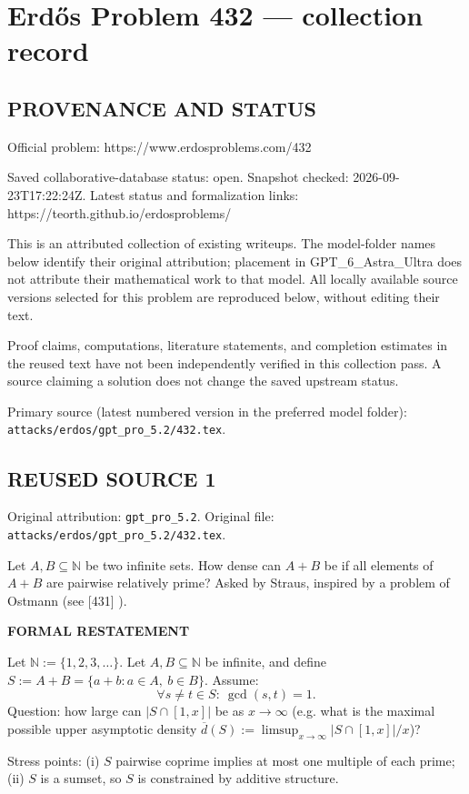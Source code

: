 \section*{Erd\H{o}s Problem 432 --- collection record}

\subsection*{PROVENANCE AND STATUS}
Official problem: https://www.erdosproblems.com/432

Saved collaborative-database status: open.
Snapshot checked: 2026-09-23T17:22:24Z.
Latest status and formalization links: https://teorth.github.io/erdosproblems/

This is an attributed collection of existing writeups. The model-folder names below identify their original attribution; placement in GPT\_6\_Astra\_Ultra does not attribute their mathematical work to that model. All locally available source versions selected for this problem are reproduced below, without editing their text.

Proof claims, computations, literature statements, and completion estimates in the reused text have not been independently verified in this collection pass. A source claiming a solution does not change the saved upstream status.

Primary source (latest numbered version in the preferred model folder): \texttt{attacks/erdos/gpt\_pro\_5.2/432.tex}.

\subsection*{REUSED SOURCE 1}
Original attribution: \texttt{gpt\_pro\_5.2}.
Original file: \texttt{attacks/erdos/gpt\_pro\_5.2/432.tex}.


Let $A,B\subseteq \mathbb{N}$ be two infinite sets. How dense can $A+B$ be if all elements of $A+B$ are pairwise relatively prime? Asked by Straus, inspired by a problem of Ostmann (see [431] ).


\medskip
\noindent\textbf{FORMAL RESTATEMENT}

Let $\mathbb N:=\{1,2,3,\dots\}$. Let $A,B\subseteq\mathbb N$ be infinite, and define $S:=A+B=\{a+b:a\in A,\ b\in B\}$. Assume:
\[
\forall s\ne t\in S:\ \gcd(s,t)=1.
\]
Question: how large can $|S\cap[1,x]|$ be as $x\to\infty$ (e.g. what is the maximal possible upper asymptotic density $\overline d(S):=\limsup_{x\to\infty}|S\cap[1,x]|/x$)?

Stress points: (i) $S$ pairwise coprime implies at most one multiple of each prime; (ii) $S$ is a sumset, so $S$ is constrained by additive structure.

